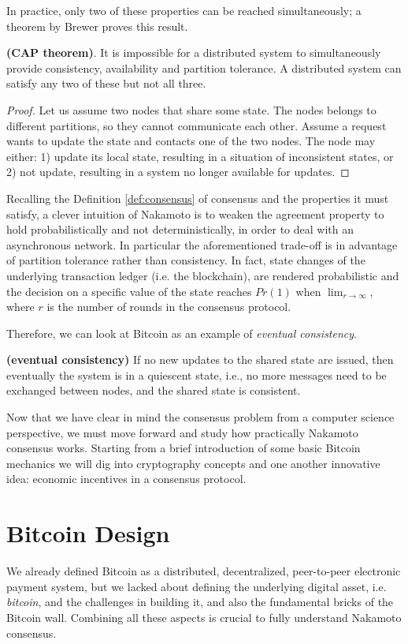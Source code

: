 \bigskip
\noindent
In practice, only two of these properties can be reached simultaneously; a theorem by Brewer proves this result.
\begin{thm} {\bf (CAP theorem)}.
    It is impossible for a distributed system to simultaneously provide consistency, availability and partition tolerance. A distributed system can satisfy any two of these but not all three.
\end{thm}
\begin{proof}
    Let us assume two nodes that share some state. The nodes belongs to different partitions, so they cannot communicate each other. Assume a request wants to update the state and contacts one of the two nodes. The node may either: 1) update its local state, resulting in a situation of inconsistent states, or 2) not update, resulting in a system no longer available for updates.
\end{proof}

\bigskip
\noindent
Recalling the Definition \ref{def:consensus} of consensus and the properties it must satisfy, a clever intuition of Nakamoto is to weaken the agreement property to hold probabilistically and not deterministically, in order to deal with an asynchronous network. In particular the aforementioned trade-off is in advantage of partition tolerance rather than consistency. In fact, state changes of the underlying transaction ledger (i.e. the blockchain), are rendered probabilistic and the decision on a specific value of the state reaches $Pr(1)$ when $\lim_{r \to \infty}$, where $r$ is the number of rounds in the consensus protocol.

\bigskip
\noindent
Therefore, we can look at Bitcoin as an example of \textit{eventual consistency}.
\begin{mydef}{\bf (eventual consistency)}
    If no new updates to the shared state are issued, then eventually the system is in a quiescent state, i.e., no more messages need to be exchanged between nodes, and the shared state is consistent.
\end{mydef}

\bigskip
\noindent
Now that we have clear in mind the consensus problem from a computer science perspective, we must move forward and study how practically Nakamoto consensus works. Starting from a brief introduction of some basic Bitcoin mechanics we will dig into cryptography concepts and one another innovative idea: economic incentives in a consensus protocol.

\bigskip
\section{Bitcoin Design}
We already defined Bitcoin as a distributed, decentralized, peer-to-peer electronic payment system, but we lacked about defining the underlying digital asset, i.e. \textit{bitcoin}, and the challenges in building it, and also the fundamental bricks of the Bitcoin wall. Combining all these aspects is crucial to fully understand Nakamoto consensus.

